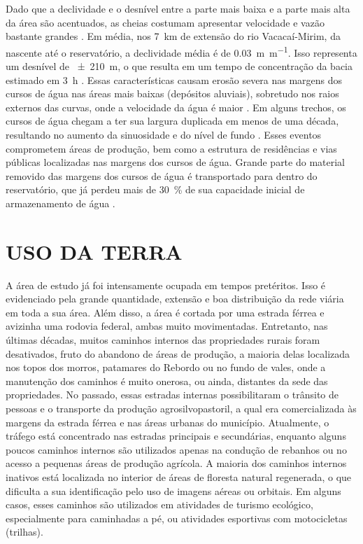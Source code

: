 Dado que a declividade e o desnível entre a parte mais baixa e a parte mais alta da área são acentuados, as 
cheias costumam apresentar velocidade e vazão bastante grandes \cite{PaivaEtAl2001, SutiliEtAl2009}. Em média, 
nos \SI{7}{\km} de extensão do rio Vacacaí-Mirim, da nascente até o reservatório, a declividade média é de 
\SI{0,03}{\m\per\m}. Isso representa um desnível de \SI{\pm210}{\m}, o que resulta em um tempo de concentração 
da bacia estimado em \SI{3}{\hour} \cite{PaivaEtAl2001}. Essas características causam erosão severa nas 
margens dos cursos de água nas áreas mais baixas (depósitos aluviais), sobretudo nos raios externos das 
curvas, onde a velocidade da água é maior \cite{SutiliEtAl2009}. Em alguns trechos, os cursos de água chegam a 
ter sua largura duplicada em menos de uma década, resultando no aumento da sinuosidade e do nível de fundo 
\cite{PaivaEtAl2001}. Esses eventos comprometem áreas de produção, bem como a estrutura de residências e vias 
públicas localizadas nas margens dos cursos de água. Grande parte do material removido das margens dos cursos 
de água é transportado para dentro do reservatório, que já perdeu mais de \SI{30}{\percent} de sua capacidade 
inicial de armazenamento de água \cite{DillEtAl2004}.

\section{USO DA TERRA}
\label{sec:chap02-landuse}

A área de estudo já foi intensamente ocupada em tempos pretéritos. Isso é evidenciado pela grande quantidade, 
extensão e boa distribuição da rede viária em toda a sua área. Além disso, a área é cortada por uma estrada 
férrea e avizinha uma rodovia federal, ambas muito movimentadas. Entretanto, nas últimas décadas, muitos 
caminhos internos das propriedades rurais foram desativados, fruto do abandono de áreas de produção, a maioria 
delas localizada nos topos dos morros, patamares do Rebordo ou no fundo de vales, onde a manutenção dos 
caminhos é muito onerosa, ou ainda, distantes da sede das propriedades. No passado, essas estradas internas 
possibilitaram o trânsito de pessoas e o transporte da produção agrosilvopastoril, a qual era comercializada 
às margens da estrada férrea e nas áreas urbanas do município. Atualmente, o tráfego está concentrado nas 
estradas principais e secundárias, enquanto alguns poucos caminhos internos são utilizados apenas na condução 
de rebanhos ou no acesso a pequenas áreas de produção agrícola. A maioria dos caminhos internos inativos está 
localizada no interior de áreas de floresta natural regenerada, o que dificulta a sua identificação pelo uso 
de imagens aéreas ou orbitais. Em alguns casos, esses caminhos são utilizados em atividades de turismo 
ecológico, especialmente para caminhadas a pé, ou atividades esportivas com motocicletas (trilhas).

